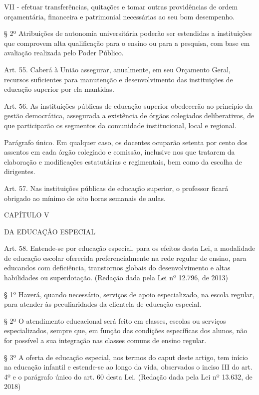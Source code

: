 \documentclass[
]{book}
\begin{document}
VII - efetuar transferências, quitações e tomar outras providências de ordem orçamentária, financeira e patrimonial necessárias ao seu bom desempenho.

§ 2º Atribuições de autonomia universitária poderão ser estendidas a instituições que comprovem alta qualificação para o ensino ou para a pesquisa, com base em avaliação realizada pelo Poder Público.

Art. 55. Caberá à União assegurar, anualmente, em seu Orçamento Geral, recursos suficientes para manutenção e desenvolvimento das instituições de educação superior por ela mantidas.

Art. 56. As instituições públicas de educação superior obedecerão ao princípio da gestão democrática, assegurada a existência de órgãos colegiados deliberativos, de que participarão os segmentos da comunidade institucional, local e regional.

Parágrafo único. Em qualquer caso, os docentes ocuparão setenta por cento dos assentos em cada órgão colegiado e comissão, inclusive nos que tratarem da elaboração e modificações estatutárias e regimentais, bem como da escolha de dirigentes.

Art. 57. Nas instituições públicas de educação superior, o professor ficará obrigado ao mínimo de oito horas semanais de aulas.

CAPÍTULO V

DA EDUCAÇÃO ESPECIAL

Art. 58. Entende-se por educação especial, para os efeitos desta Lei, a modalidade de educação escolar oferecida preferencialmente na rede regular de ensino, para educandos com deficiência, transtornos globais do desenvolvimento e altas habilidades ou superdotação. (Redação dada pela Lei nº 12.796, de 2013)

§ 1º Haverá, quando necessário, serviços de apoio especializado, na escola regular, para atender às peculiaridades da clientela de educação especial.

§ 2º O atendimento educacional será feito em classes, escolas ou serviços especializados, sempre que, em função das condições específicas dos alunos, não for possível a sua integração nas classes comuns de ensino regular.

§ 3º A oferta de educação especial, nos termos do caput deste artigo, tem início na educação infantil e estende-se ao longo da vida, observados o inciso III do art. 4º e o parágrafo único do art. 60 desta Lei. (Redação dada pela Lei nº 13.632, de 2018)
\end{document}
